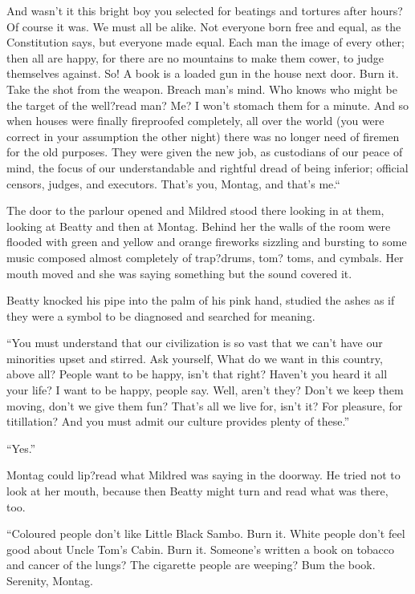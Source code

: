 \documentclass[11pt,openany]{book}
\begin{document}
And wasn't it this bright boy you selected for beatings and tortures after hours? Of course it was. We must all be alike. Not everyone born free and equal, as the Constitution says, but everyone made equal. Each man the image of every other; then all are happy, for there are no mountains to make them cower, to judge themselves against. So! A book is a loaded gun in the house next door. Burn it. Take the shot from the weapon. Breach man's mind. Who knows who might be the target of the well?read man? Me? I won't stomach them for a minute. And so when houses were finally fireproofed completely, all over the world (you were correct in your assumption the other night) there was no longer need of firemen for the old purposes. They were given the new job, as custodians of our peace of mind, the focus of our understandable and rightful dread of being inferior; official censors, judges, and executors. That's you, Montag, and that's me.``

The door to the parlour opened and Mildred stood there looking in at them, looking at Beatty and then at Montag. Behind her the walls of the room were flooded with green and yellow and orange fireworks sizzling and bursting to some music composed almost completely of trap?drums, tom? toms, and cymbals. Her mouth moved and she was saying something but the sound covered it.

Beatty knocked his pipe into the palm of his pink hand, studied the ashes as if they were a symbol to be diagnosed and searched for meaning.

``You must understand that our civilization is so vast that we can't have our minorities upset and stirred. Ask yourself, What do we want in this country, above all? People want to be happy, isn't that right? Haven't you heard it all your life? I want to be happy, people say. Well, aren't they? Don't we keep them moving, don't we give them fun? That's all we live for, isn't it? For pleasure, for titillation? And you must admit our culture provides plenty of these.''

``Yes.''

Montag could lip?read what Mildred was saying in the doorway. He tried not to look at her mouth, because then Beatty might turn and read what was there, too.

``Coloured people don't like Little Black Sambo. Burn it. White people don't feel good about Uncle Tom's Cabin. Burn it. Someone's written a book on tobacco and cancer of the lungs? The cigarette people are weeping? Bum the book. Serenity, Montag.
\end{document}
